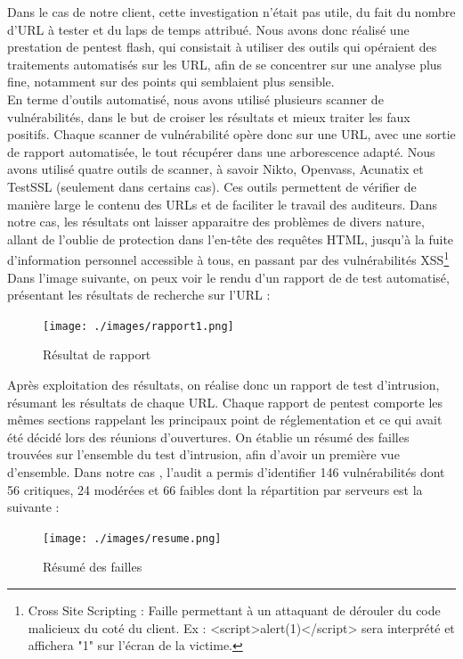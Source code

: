 \documentclass[a4paper]{memoir}
\begin{document}
Dans le cas de notre client, cette investigation n'était pas utile, du fait du nombre d'URL à tester et du laps de temps attribué. Nous avons donc réalisé une prestation de pentest flash, qui consistait à utiliser des outils qui opéraient des traitements automatisés sur les URL, afin de se concentrer sur une analyse plus fine, notamment sur des points qui semblaient plus sensible.\\
En terme d'outils automatisé, nous avons utilisé plusieurs scanner de vulnérabilités, dans le but de croiser les résultats et mieux traiter les faux positifs. Chaque scanner de vulnérabilité opère donc sur une URL, avec une sortie de rapport automatisée, le tout récupérer dans une arborescence adapté. Nous avons utilisé quatre outils de scanner, à savoir Nikto, Openvass, Acunatix et TestSSL (seulement dans certains cas). Ces outils permettent de vérifier de manière large le contenu des URLs et de faciliter le travail des auditeurs.
Dans notre cas, les résultats ont laisser apparaitre des problèmes de divers nature, allant de l'oublie de protection dans l'en-tête des requêtes HTML, jusqu'à la fuite d'information personnel accessible à tous, en passant par des vulnérabilités XSS\footnote{Cross Site Scripting : Faille permettant à un attaquant de dérouler du code malicieux du coté du client. Ex : <script>alert(1)</script> sera interprété et affichera "1" sur l'écran de la victime.}
Dans l'image suivante, on peux voir le rendu d'un rapport de de test automatisé, présentant les résultats de recherche sur l'URL :

\begin{figure}[!ht]
    \center
    \texttt{[image: ./images/rapport1.png]}
    \caption{Résultat de rapport}
    \label{ID}
\end{figure}

Après exploitation des résultats, on réalise donc un rapport de test d'intrusion, résumant les résultats de chaque URL. Chaque rapport de pentest comporte les mêmes sections rappelant les principaux point de réglementation et ce qui avait été décidé lors des réunions d'ouvertures. 
On établie un résumé des failles trouvées sur l'ensemble du test d'intrusion, afin d'avoir un première vue d'ensemble. Dans notre cas , l’audit a permis d’identifier 146 vulnérabilités dont 56 critiques, 24 modérées et 66 faibles dont la répartition par serveurs est la suivante :

\begin{figure}[!ht]
    \center
    \texttt{[image: ./images/resume.png]}
    \caption{Résumé des failles}
    \label{ID}
\end{figure}
\end{document}
